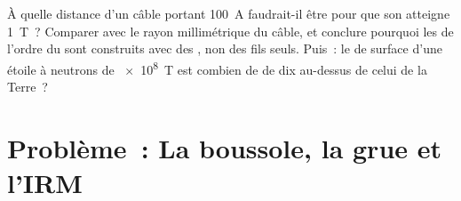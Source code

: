 \begin{exercise}[$\star\star\star$]\label{exo:g11:magnetic-fields:15}
À quelle distance d'un câble portant \qty{100}{A} faudrait-il être pour
que son  atteigne \qty{1}{T}~?
Comparer avec le rayon millimétrique du câble, et conclure pourquoi les
 de l'ordre du  sont
construits avec des , non des fils
seuls. Puis~: le  de surface
d'une étoile à neutrons de \qty{e8}{T} est combien de
 de dix au-dessus de celui de la
Terre~?
\end{exercise}

\section{Problème~: La boussole, la grue et l'IRM}

